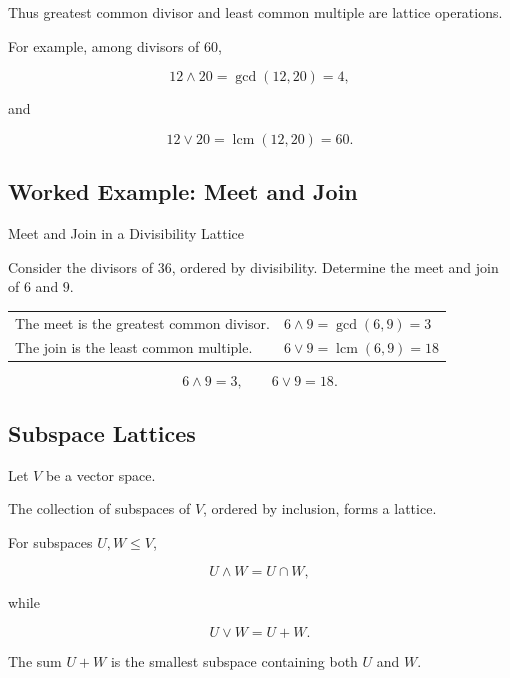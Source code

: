 Thus greatest common divisor and least common multiple are lattice
operations.

For example, among divisors of \(60\),

\[ 12\wedge20=\gcd(12,20)=4, \]

and

\[ 12\vee20=\operatorname{lcm}(12,20)=60. \]

\subsection{Worked Example: Meet and Join}
\label{subsec:worked-meet-join}

\begin{workedexamplebox}{Meet and Join in a Divisibility Lattice}

Consider the divisors of \(36\), ordered by divisibility. Determine the meet
and join of \(6\) and \(9\).

\begin{tabularx}{\textwidth}{@{}>{\raggedright\arraybackslash}p{}X@{}}
The meet is the greatest common divisor. &
\(6\wedge9=\gcd(6,9)=3\)\\
The join is the least common multiple. &
\(6\vee9=\operatorname{lcm}(6,9)=18\)
\end{tabularx}

\begin{answerbox}
\[ \boxed{6\wedge9=3,\qquad6\vee9=18.} \]
\end{answerbox}
\end{workedexamplebox}

\subsection{Subspace Lattices}
\label{subsec:subspace-lattices}

Let \(V\) be a vector space.

The collection of subspaces of \(V\), ordered by inclusion, forms a lattice.

For subspaces \(U,W\leq V\),

\[ U\wedge W=U\cap W, \]

while

\[ U\vee W=U+W. \]

The sum \(U+W\) is the smallest subspace containing both \(U\) and \(W\).

